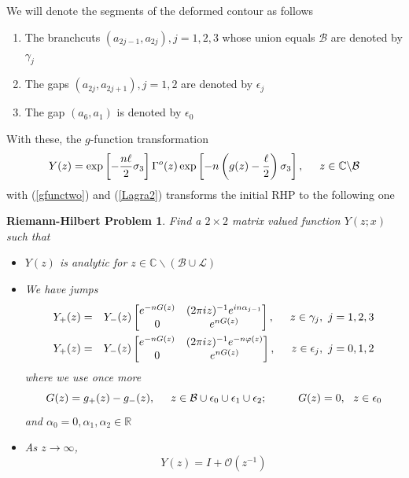 \documentclass[10pt,oneside,reqno]{amsart}
\numberwithin{equation}{section}
\newtheorem{problem}[theorem]{Riemann-Hilbert Problem}
\def\eqref#1{(\ref{#1})}
\begin{document}
We will denote the segments of the deformed contour as follows
\begin{enumerate}
 \item 	The branchcuts $(a_{2j-1},a_{2j}),j=1,2,3$ whose union equals $\mathcal{B}$ are denoted by $\gamma_j$
  \item The gaps $(a_{2j},a_{2j+1}),j=1,2$ are denoted by $\epsilon_j$
  \item The gap $(a_6,a_1)$ is denoted by $\epsilon_0$
\end{enumerate}
With these, the $g$-function transformation
\begin{equation*}
  Y(z) = \exp\left[-\frac{n\ell}{2}\sigma_3\right]\Gamma^o(z)\exp\left[-n\left(g(z)-\frac{\ell}{2}\right)\sigma_3\right],\hspace{0.5cm}z\in\mathbb{C}\backslash\mathcal{B}
\end{equation*}
with \eqref{gfunctwo} and \eqref{Lagra2} transforms the initial RHP to the following one 
\begin{problem}
\label{RHPY} 
Find a $2\times 2$ matrix valued function $Y(z;x)$ such that 
\begin{itemize}
 \item $Y(z)$ is analytic for $z\in\mathbb{C}\backslash(\mathcal{B}\cup \mathcal{L})$
  \item We have jumps
 \begin{eqnarray*}
    Y_+(z) &=& Y_-(z) \begin{bmatrix}
e^{-nG(z)} & (2\pi iz)^{-1}e^{in\alpha_{j-1}} \\
0 & e^{nG(z)} \\
\end{bmatrix},\hspace{0.5cm}z\in\gamma_j,\ j=1,2,3\\
Y_+(z)&=&Y_-(z)\begin{bmatrix}
                            e^{-nG(z)} & (2\pi iz)^{-1}e^{-n\varphi(z)}\\
0 & e^{nG(z)}
                           \end{bmatrix},\hspace{0.5cm}z\in \epsilon_j,\ j=0,1,2
 \end{eqnarray*}
where we use once more
\begin{equation*}
 G(z) = g_+(z)-g_-(z),\hspace{0.5cm}z\in\mathcal{B}\cup \epsilon_0\cup\epsilon_1\cup \epsilon_2;\hspace{1cm}G(z)=0,\ \ z\in\epsilon_0
\end{equation*}
and $\alpha_0=0,\alpha_1,\alpha_2\in\mathbb{R}$
  \item As $z\rightarrow\infty$,
\begin{equation*}
  Y(z) = I+\mathcal O\left(z^{-1}\right)
\end{equation*}
\end{itemize}
\end{problem}
\end{document}

